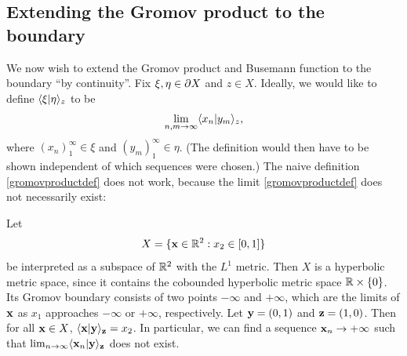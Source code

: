 \subsection{Extending the Gromov product to the boundary}
We now wish to extend the Gromov product and Busemann function to the boundary ``by continuity''. Fix $\xi,\eta\in\partial X$ and $z\in X$. Ideally, we would like to define $\langle \xi|\eta\rangle_z$ to be
\begin{equation}
\label{gromovproductdef}
\lim_{n,m\to\infty}\langle x_n|y_m\rangle_z ,
\end{equation}
where $(x_n)_1^\infty\in\xi$ and $(y_m)_1^\infty\in\eta$. (The definition would then have to be shown independent of which sequences were chosen.) The naive definition \eqref{gromovproductdef} does not work, because the limit \eqref{gromovproductdef} does not necessarily exist:
\begin{example}
\label{examplegromovnotcont}
Let
\[
X = \{\xx\in\R^2: x_2\in[0,1]\}
\]
be interpreted as a subspace of $\R^2$ with the $L^1$ metric. Then $X$ is a hyperbolic metric space, since it contains the cobounded hyperbolic metric space $\R\times\{0\}$. Its Gromov boundary consists of two points $-\infty$ and $+\infty$, which are the limits of $\mathbf x$ as $x_1$ approaches $-\infty$ or $+\infty$, respectively. Let $\mathbf y = (0,1)$ and $\mathbf z = (1,0)$. Then for all $\mathbf x\in X$, $\langle \mathbf x|\mathbf y\rangle_\mathbf z = x_2$. In particular, we can find a sequence $\mathbf x_n\to +\infty$ such that $\lim_{n\to\infty} \langle \mathbf x_n|\mathbf y\rangle_\mathbf z$ does not exist.
\end{example}

